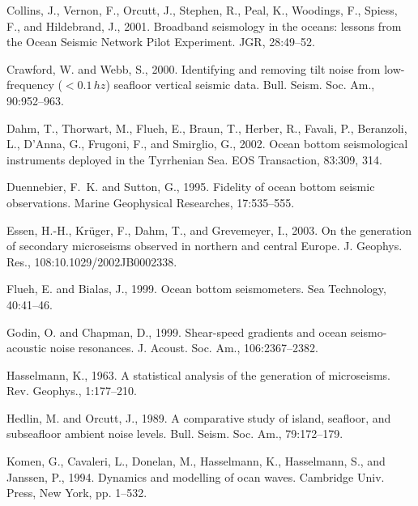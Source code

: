 \documentclass{article}
\begin{document}
{\begin{thebibliography}{}
Collins, J., Vernon, F., Orcutt, J., Stephen, R., Peal, K., Woodings, F.,
  Spiess, F., and Hildebrand, J., 2001.
\newblock Broadband seismology in the oceans: lessons from the {Ocean Seismic
  Network Pilot Experiment}.
\newblock JGR, 28:49--52.

Crawford, W. and Webb, S., 2000.
\newblock Identifying and removing tilt noise from low-frequency ($< 0.1\, hz$)
  seafloor vertical seismic data.
\newblock Bull. Seism. Soc. Am., 90:952--963.

Dahm, T., Thorwart, M., Flueh, E., Braun, T., Herber, R., Favali, P.,
  Beranzoli, L., D'Anna, G., Frugoni, F., and Smirglio, G., 2002.
\newblock Ocean bottom seismological instruments deployed in the {Tyrrhenian
  Sea}.
\newblock EOS Transaction, 83:309, 314.

Duennebier, F.~K. and Sutton, G., 1995.
\newblock Fidelity of ocean bottom seismic observations.
\newblock Marine Geophysical Researches, 17:535--555.

Essen, H.-H., Kr\"uger, F., Dahm, T., and Grevemeyer, I., 2003.
\newblock On the generation of secondary microseisms observed in northern and
  central {Europe}.
\newblock J. Geophys. Res., 108:10.1029/2002JB0002338.

Flueh, E. and Bialas, J., 1999.
\newblock Ocean bottom seismometers.
\newblock Sea Technology, 40:41--46.

Godin, O. and Chapman, D., 1999.
\newblock Shear-speed gradients and ocean seismo-acoustic noise resonances.
\newblock J. Acoust. Soc. Am., 106:2367--2382.

Hasselmann, K., 1963.
\newblock A statistical analysis of the generation of microseisms.
\newblock Rev. Geophys., 1:177--210.

Hedlin, M. and Orcutt, J., 1989.
\newblock A comparative study of island, seafloor, and subseafloor ambient
  noise levels.
\newblock Bull. Seism. Soc. Am., 79:172--179.

Komen, G., Cavaleri, L., Donelan, M., Hasselmann, K., Hasselmann, S., and
  Janssen, P., 1994.
\newblock Dynamics and modelling of ocan waves.
\newblock Cambridge Univ. Press, New York, pp. 1--532.


\end{thebibliography}}
\end{document}
